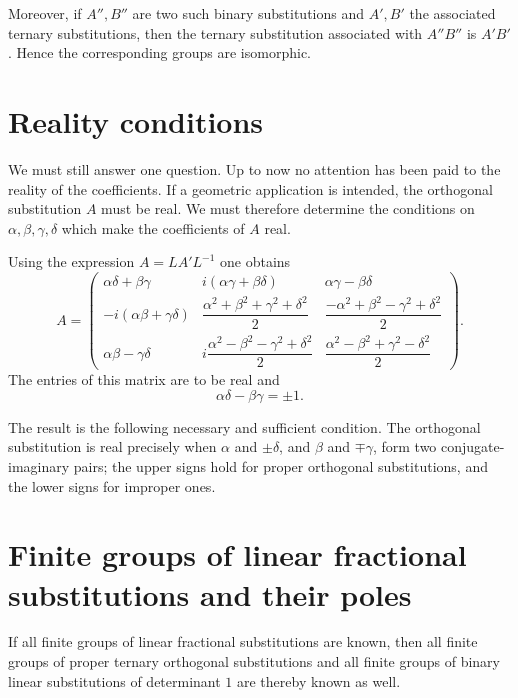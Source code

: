 \documentclass[11pt,a4paper]{book}
\begin{document}
Moreover, if $A'',B''$ are two such binary substitutions and $A',B'$ the associated ternary substitutions, then the ternary substitution associated with $A''B''$ is $A'B'$.  Hence the corresponding groups are isomorphic.

\section{Reality conditions}

We must still answer one question.  Up to now no attention has been paid to the reality of the coefficients.  If a geometric application is intended, the orthogonal substitution $A$ must be real.  We must therefore determine the conditions on $\alpha,\beta,\gamma,\delta$ which make the coefficients of $A$ real.

Using the expression $A=LA'L^{-1}$ one obtains
\[
A=\begin{pmatrix}
\alpha\delta+\beta\gamma&i(\alpha\gamma+\beta\delta)&\alpha\gamma-\beta\delta\\
-i(\alpha\beta+\gamma\delta)&\dfrac{\alpha^2+\beta^2+\gamma^2+\delta^2}{2}&\dfrac{-\alpha^2+\beta^2-\gamma^2+\delta^2}{2}\\
\alpha\beta-\gamma\delta&i\dfrac{\alpha^2-\beta^2-\gamma^2+\delta^2}{2}&\dfrac{\alpha^2-\beta^2+\gamma^2-\delta^2}{2}
\end{pmatrix}.
\]
The entries of this matrix are to be real and
\begin{equation}\label{eq:w9-real-det}
 \alpha\delta-\beta\gamma=\pm1.
\end{equation}

The result is the following necessary and sufficient condition.  The orthogonal substitution is real precisely when $\alpha$ and $\pm\delta$, and $\beta$ and $\mp\gamma$, form two conjugate-imaginary pairs; the upper signs hold for proper orthogonal substitutions, and the lower signs for improper ones.

\section{Finite groups of linear fractional substitutions and their poles}

If all finite groups of linear fractional substitutions are known, then all finite groups of proper ternary orthogonal substitutions and all finite groups of binary linear substitutions of determinant $1$ are thereby known as well.
\end{document}
